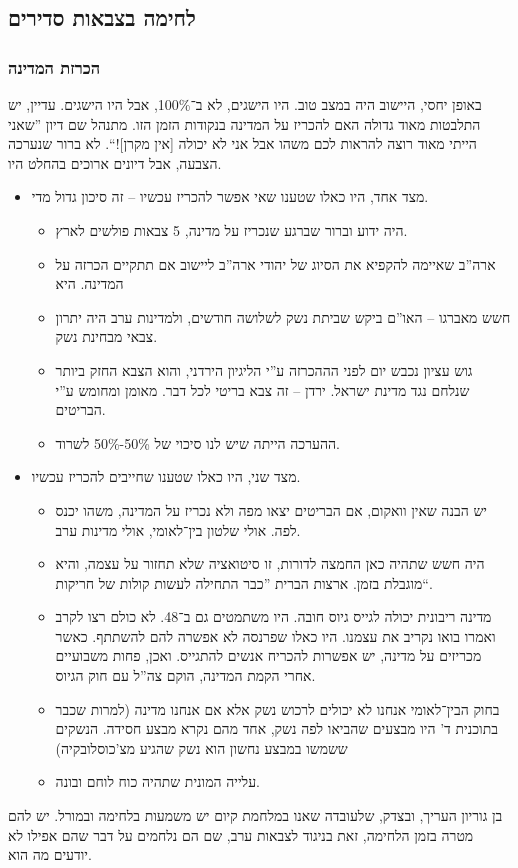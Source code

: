 \documentclass[]{../../../../tex/classes/styledArticle}
\begin{document}
	\subsection*{לחימה בצבאות סדירים}
	\subsubsection*{הכרזת המדינה}
	באופן יחסי, היישוב היה במצב טוב. היו הישגים, לא ב־100\%, אבל היו הישגים. עדיין, יש התלבטות מאוד גדולה האם להכריז על המדינה בנקודות הזמן הזו. מתנהל שם דיון ''שאני הייתי מאוד רוצה להראות לכם משהו אבל אני לא יכולה [אין מקרן]!``. לא ברור שנערכה הצבעה, אבל דיונים ארוכים בהחלט היו. 
	\begin{itemize}
		\item מצד אחד, היו כאלו שטענו שאי אפשר להכריז עכשיו – זה סיכון גדול מדי. 
		\begin{itemize}
			\item היה ידוע וברור שברגע שנכריז על מדינה, 5 צבאות פולשים לארץ. 
			\item ארה''ב שאיימה להקפיא את הסיוג של יהודי ארה''ב ליישוב אם תתקיים הכרזה על המדינה. היא 
			\item חשש מאברגו – האו''ם ביקש שביתת נשק לשלושה חודשים, ולמדינות ערב היה יתרון צבאי מבחינת נשק. 
			\item גוש עציון נכבש יום לפני הההכרזה ע''י הליגיון הירדני, והוא הצבא החזק ביותר שנלחם נגד מדינת ישראל. ירדן – זה צבא בריטי לכל דבר. מאומן ומחומש ע''י הבריטים. 
			\item ההערכה הייתה שיש לנו סיכוי של 50\%-50\% לשרוד. 
		\end{itemize}
		\item מצד שני, היו כאלו שטענו שחייבים להכריז עכשיו. 
		\begin{itemize}
			\item יש הבנה שאין וואקום, אם הבריטים יצאו מפה ולא נכריז על המדינה, משהו יכנס לפה. אולי שלטון בין־לאומי, אולי מדינות ערב. 
			\item היה חשש שתהיה כאן החמצה לדורות, זו סיטואציה שלא תחזור על עצמה, והיא מוגבלת בזמן. ארצות הברית ''כבר התחילה לעשות קולות של חריקות``. 
			\item מדינה ריבונית יכולה לגייס גיוס חובה. היו משתמטים גם ב־48. לא כולם רצו לקרב ואמרו בואו נקריב את עצמנו. היו כאלו שפרנסה לא אפשרה להם להשתתף. כאשר מכריזים על מדינה, יש אפשרות להכריח אנשים להתגייס. ואכן, פחות משבועיים אחרי הקמת המדינה, הוקם צה''ל עם חוק הגיוס. 
			\item בחוק הבין־לאומי אנחנו לא יכולים לרכוש נשק אלא אם אנחנו מדינה (למרות שכבר בתוכנית ד' היו מבצעים שהביאו לפה נשק, אחד מהם נקרא מבצע חסידה. הנשקים ששמשו במבצע נחשון הוא נשק שהגיע מצ'כוסלובקיה)
			\item עלייה המונית שתהיה כוח לוחם ובונה. 
		\end{itemize}
	\end{itemize}
	בן גוריון העריך, ובצדק, שלעובדה שאנו במלחמת קיום יש משמעות בלחימה ובמורל. יש להם מטרה בזמן הלחימה, זאת בניגוד לצבאות ערב, שם הם נלחמים על דבר שהם אפילו לא יודעים מה הוא. 
	
\end{document}
